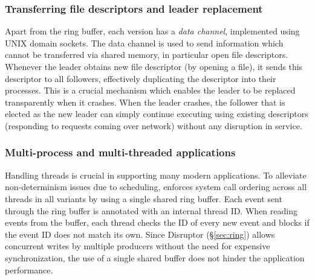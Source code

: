 \subsubsection{Transferring file descriptors and leader replacement}
\label{sec:leader-repl}

Apart from the ring buffer, each version has a \textit{data channel},
implemented using UNIX domain sockets.
The data channel is used to send information which cannot be
transferred via shared memory, in particular open file descriptors.
Whenever the leader obtains new file descriptor (\eg by opening a
file), it sends this descriptor to all followers, effectively
duplicating the descriptor into their processes. This is a crucial
mechanism which enables the leader to be replaced transparently when
it crashes. When the leader crashes, the follower that is elected as
the new leader can simply continue executing using existing
descriptors (\eg responding to requests coming over network) without
any disruption in service.



\subsubsection{Multi-process and multi-threaded applications}
\label{sec:threading}

Handling threads is crucial in supporting many modern applications. To
alleviate non-determinism issues due to scheduling, \nx enforces
system call ordering across all threads in all variants by using a
single shared ring buffer.  Each event sent through the ring buffer is
annotated with an internal thread ID. When reading events from the
buffer, each thread checks the ID of every new event and blocks if the
event ID does not match its own.  Since Disruptor (\S\ref{sec:ring})
allows concurrent writes by multiple producers without the need for
expensive synchronization, the use of a single shared buffer does not
hinder the application performance.

